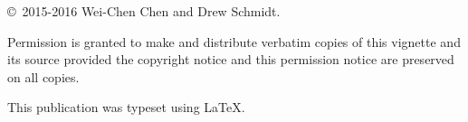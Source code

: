 
\null
\vfill
\copyright\ 2015-2016 Wei-Chen Chen and Drew Schmidt.

Permission is granted to make and distribute verbatim copies of
this vignette and its source provided the copyright notice and
this permission notice are preserved on all copies.

This publication was typeset using \LaTeX.
